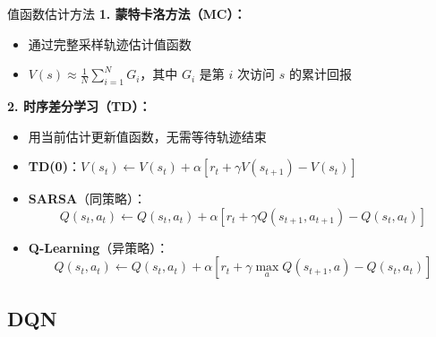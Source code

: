 \documentclass{beamer}
\begin{document}
\begin{frame}{值函数估计方法}
    \textbf{1. 蒙特卡洛方法（MC）：}
    \begin{itemize}
        \item 通过完整采样轨迹估计值函数
        \item $V(s) \approx \frac{1}{N} \sum_{i=1}^N G_i$，其中 $G_i$ 是第 $i$ 次访问 $s$ 的累计回报
    \end{itemize}
    
    \vspace{0.3cm}
    
    \textbf{2. 时序差分学习（TD）：}
    \begin{itemize}
        \item 用当前估计更新值函数，无需等待轨迹结束
        \item \textbf{TD(0)}：$V(s_t) \leftarrow V(s_t) + \alpha [r_t + \gamma V(s_{t+1}) - V(s_t)]$
        \item \textbf{SARSA}（同策略）：
        \[ Q(s_t,a_t) \leftarrow Q(s_t,a_t) + \alpha [r_t + \gamma Q(s_{t+1},a_{t+1}) - Q(s_t,a_t)] \]
        \item \textbf{Q-Learning}（异策略）：
        \[ Q(s_t,a_t) \leftarrow Q(s_t,a_t) + \alpha [r_t + \gamma \max_a Q(s_{t+1},a) - Q(s_t,a_t)] \]
    \end{itemize}
\end{frame}

\subsection{DQN}
\end{document}
